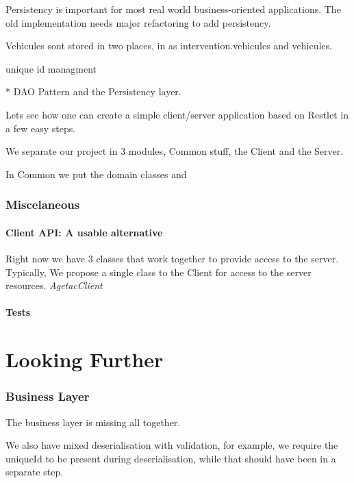 \documentclass[12pt]{scrartcl}
\begin{document}
Persistency is important for most real world business-oriented applications. The old implementation needs major refactoring to add persistency.

Vehicules sont stored in two places, in as intervention.vehicules and vehicules.

unique id managment

* DAO Pattern and the Persistency layer.

Lets see how one can create a simple client/server application based on Restlet in a few easy steps.

We separate our project in 3 modules, Common stuff, the Client and the Server.

In Common we put the domain classes and


\newpage

\section{Miscelaneous}

\subsection{Client API: A usable alternative}

Right now we have 3 classes that work together to provide access to the server. Typically, We propose a single class to the Client for access to the server resources. \emph{AgetacClient}

\subsection{Tests}

\part{Looking Further}

\section{Business Layer}

The business layer is missing all together.

We also have mixed deserialisation with validation, for example, we require the uniqueId to be present during deserialisation, while that should have been in a separate step.
\end{document}
